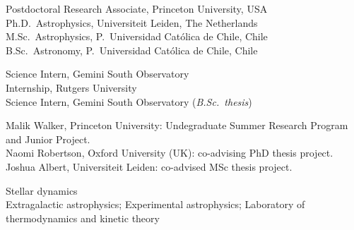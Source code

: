 \documentclass[11pt]{article}
\begin{document}

\noindent
{} Postdoctoral Research Associate, Princeton University, USA\\
 Ph.D.~Astrophysics, Universiteit Leiden, The Netherlands\\
 M.Sc.~Astrophysics, P.~Universidad Cat\'olica de Chile, Chile\\
 B.Sc.~Astronomy, P.~Universidad Cat\'olica de Chile, Chile



\noindent
{} Science Intern, Gemini South Observatory\\
 Internship, Rutgers University\\
 Science Intern, Gemini South Observatory (\emph{B.Sc.\ thesis})\\




\noindent
{} Malik Walker, Princeton University: Undegraduate Summer Research Program and Junior Project.\\
 Naomi Robertson, Oxford University (UK): co-advising PhD thesis project.\\
 Joshua Albert, Universiteit Leiden: co-advised MSc thesis project. 


\noindent
{} Stellar dynamics\\
 Extragalactic astrophysics; Experimental astrophysics; Laboratory of thermodynamics and kinetic theory\\


\pagebreak
\end{document}
